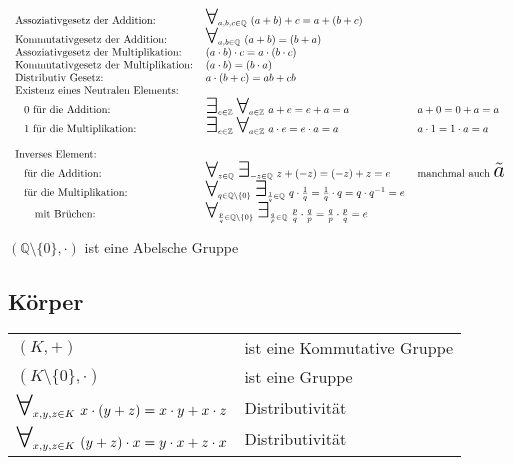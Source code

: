 \documentclass[a4paper]{scrartcl}
\newcommand\bigforall{\mbox{\huge $\forall$}}
\newcommand\bigexists{\mbox{\huge $\exists$}}
\begin{document}
\begin{align}
\begin{tabular}{l l l}
Assoziativgesetz der Addition:& $\bigforall_{a,b,c \in \mathbb{Q}}  \ (a+b)+c= a+(b+c)   $ \\
Kommutativgesetz der Addition:& $\bigforall_{a,b \in \mathbb{Q}} \ (a+b)=(b+a) $ \\
Assoziativgesetz der Multiplikation:& $(a \cdot b) \cdot c = a \cdot (b \cdot c) $ \\
Kommutativgesetz der Multiplikation:& $(a \cdot b)=(b \cdot a) $ \\
Distributiv Gesetz: & $ a \cdot (b+c) = ab + cb $ \\
Existenz eines Neutralen Elements: &  \\
\hspace{5pt}  0 für die Addition: & $\bigexists _{e \in \mathbb{Z}} \ \bigforall_{a \in \mathbb{Z}} \ a+e = e+a = a$&$ a + 0 = 0 + a = a $ \\
\hspace{5pt}  1 für die Multiplikation: & $\bigexists _{e \in \mathbb{Z}} \ \bigforall_{a \in \mathbb{Z}} \ a \cdot e = e \cdot a = a$& $ a \cdot 1 = 1 \cdot a = a $ \\ \\
Inverses Element: & \\
\hspace{5pt} für die Addition: &$\bigforall_{z \in \mathbb{Q}} \ \bigexists_{-z \in \mathbb{Q}} \ z + (-z)=(-z)+z = e$ & manchmal auch \huge$\tilde a$ \\
\hspace{5pt} für die Multiplikation: &$\bigforall_{q \in \mathbb{Q} \setminus \{0\}} \ \bigexists_{\frac{1}{q} \in \mathbb{Q}} \ q \cdot \frac{1}{q} =\frac{1}{q} \cdot q = q \cdot q^{-1} = e$ \\
\hspace{15pt} mit Brüchen: &$\bigforall_{\frac{p}{q} \in \mathbb{Q} \setminus \{0\}} \ \bigexists_{\frac{q}{p} \in \mathbb{Q}} \ \frac{p}{q} \cdot \frac{q}{p} =\frac{q}{p} \cdot \frac{p}{q} = e$ \\
\end{tabular}
\end{align}

$(\mathbb{Q} \setminus \{0\}, \cdot )$ ist eine Abelsche Gruppe \\

\subsection{Körper}
\begin{tabular}{l l}
$(K,+)$ & ist eine Kommutative Gruppe \\
$(K \setminus \{0\}, \cdot)$ & ist eine Gruppe \\
$\bigforall_{x,y,z \in K} \ x \cdot (y + z) = x \cdot y + x \cdot z $ & Distributivität \\
$\bigforall_{x,y,z \in K} \ (y + z) \cdot x = y \cdot x + z \cdot x $ & Distributivität \\
\end{tabular}
\end{document}
